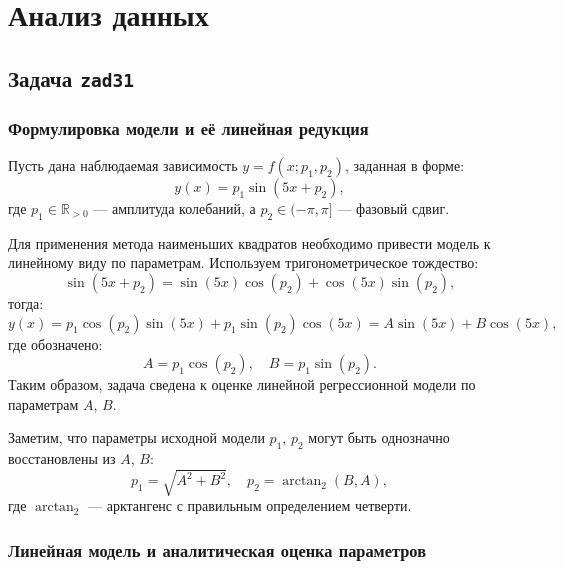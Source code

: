 \section{Анализ данных}

\subsection{Задача \texttt{zad31}}

\subsubsection{Формулировка модели и её линейная редукция}

Пусть дана наблюдаемая зависимость $y = f(x; p_1, p_2)$, заданная в форме:
\begin{equation}
    y(x) = p_1 \sin(5x + p_2),
\end{equation}
где $p_1 \in \mathbb{R}_{>0}$ — амплитуда колебаний, а $p_2 \in (-\pi, \pi]$ — фазовый сдвиг. 

Для применения метода наименьших квадратов необходимо привести модель к линейному виду по параметрам. Используем тригонометрическое тождество:
\[
\sin(5x + p_2) = \sin(5x)\cos(p_2) + \cos(5x)\sin(p_2),
\]
тогда:
\begin{equation}
    y(x) = p_1 \cos(p_2)\sin(5x) + p_1 \sin(p_2)\cos(5x) = A \sin(5x) + B \cos(5x),
\end{equation}
где обозначено:
\begin{equation}
    A = p_1 \cos(p_2), \quad B = p_1 \sin(p_2).
\end{equation}
Таким образом, задача сведена к оценке линейной регрессионной модели по параметрам $A$, $B$.

\begin{remark}
Заметим, что параметры исходной модели $p_1$, $p_2$ могут быть однозначно восстановлены из $A$, $B$:
\begin{equation}
    p_1 = \sqrt{A^2 + B^2}, \quad p_2 = \arctan_2(B, A),
\end{equation}
где $\arctan_2$ — арктангенс с правильным определением четверти.
\end{remark}

\subsubsection{Линейная модель и аналитическая оценка параметров}

